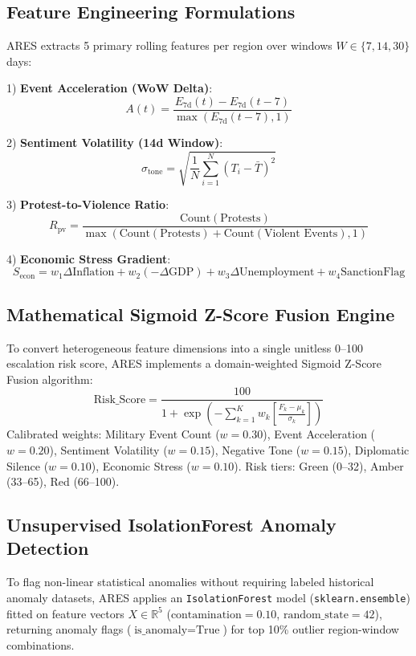 \documentclass[conference]{IEEEtran}
\begin{document}
\subsection{Feature Engineering Formulations}
ARES extracts 5 primary rolling features per region over windows $W \in \{7, 14, 30\}$ days:

1) \textbf{Event Acceleration (WoW Delta)}:
\begin{equation}
A(t) = \frac{E_{\text{7d}}(t) - E_{\text{7d}}(t-7)}{\max(E_{\text{7d}}(t-7), 1)}
\end{equation}

2) \textbf{Sentiment Volatility (14d Window)}:
\begin{equation}
\sigma_{\text{tone}} = \sqrt{ \frac{1}{N} \sum_{i=1}^N (T_i - \bar{T})^2 }
\end{equation}

3) \textbf{Protest-to-Violence Ratio}:
\begin{equation}
R_{\text{pv}} = \frac{\text{Count}(\text{Protests})}{\max(\text{Count}(\text{Protests}) + \text{Count}(\text{Violent Events}), 1)}
\end{equation}

4) \textbf{Economic Stress Gradient}:
\begin{equation}
S_{\text{econ}} = w_1 \Delta \text{Inflation} + w_2 (-\Delta \text{GDP}) + w_3 \Delta \text{Unemployment} + w_4 \text{SanctionFlag}
\end{equation}

\subsection{Mathematical Sigmoid Z-Score Fusion Engine}
To convert heterogeneous feature dimensions into a single unitless 0--100 escalation risk score, ARES implements a domain-weighted Sigmoid Z-Score Fusion algorithm:
\begin{equation}
\text{Risk\_Score} = \frac{100}{1 + \exp\left( -\sum_{k=1}^K w_k \left[ \frac{F_k - \mu_k}{\sigma_k} \right] \right)}
\end{equation}
Calibrated weights: Military Event Count ($w=0.30$), Event Acceleration ($w=0.20$), Sentiment Volatility ($w=0.15$), Negative Tone ($w=0.15$), Diplomatic Silence ($w=0.10$), Economic Stress ($w=0.10$). Risk tiers: Green (0--32), Amber (33--65), Red (66--100).

\subsection{Unsupervised IsolationForest Anomaly Detection}
To flag non-linear statistical anomalies without requiring labeled historical anomaly datasets, ARES applies an \texttt{IsolationForest} model (\texttt{sklearn.ensemble}) fitted on feature vectors $X \in \mathbb{R}^5$ ($\text{contamination}=0.10$, $\text{random\_state}=42$), returning anomaly flags ($\text{is\_anomaly} = \text{True}$) for top 10\% outlier region-window combinations.
\end{document}
